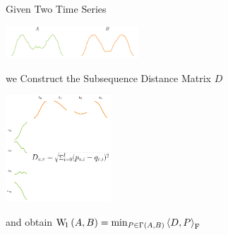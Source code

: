 Given Two Time Series 
\begin{center}
\includegraphics[height=1.2cm]{figures/two_ts.pdf} 
\end{center}

we Construct the Subsequence Distance Matrix $D$
\begin{center}
	\includegraphics[height=4cm]{figures/subsequences_distance.pdf} 
\end{center}
and obtain \qquad
	$
	\operatorname{W\!}_1\left(A, B\right) = \min_{P \in \Gamma\left(A, B\right)} \left\langle D, P \right\rangle_{\mathrm{F}}
	$